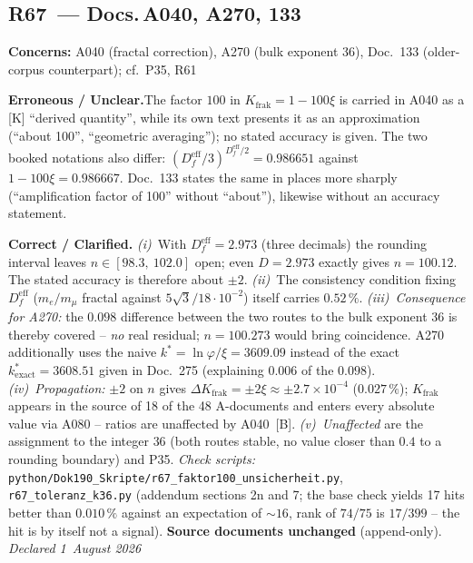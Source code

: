 \medskip

\subsection*{R67~--- Docs.\,A040, A270, 133}

\noindent\textbf{Concerns:} A040 (fractal correction), A270 (bulk exponent 36),
Doc.~133 (older-corpus counterpart); cf.\ P35, R61

\smallskip\noindent\textbf{Erroneous / Unclear.}\quad The factor $100$ in
$K_\text{frak} = 1-100\xi$ is carried in A040 as a [K] \enquote{derived
quantity}, while its own text presents it as an approximation
(\enquote{about 100}, \enquote{geometric averaging}); no stated accuracy is
given. The two booked notations also differ:
$(D_f^\text{eff}/3)^{D_f^\text{eff}/2} = 0.986651$ against
$1-100\xi = 0.986667$. Doc.~133 states the same in places more sharply
(\enquote{amplification factor of 100} without \enquote{about}), likewise
without an accuracy statement.

\smallskip\noindent\textbf{Correct / Clarified.}\quad
\emph{(i)}~With $D_f^\text{eff} = 2.973$ (three decimals) the rounding
interval leaves $n \in [98.3,\ 102.0]$ open; even $D = 2.973$ exactly gives
$n = 100.12$. The stated accuracy is therefore about $\pm2$.
\emph{(ii)}~The consistency condition fixing $D_f^\text{eff}$ ($m_e/m_\mu$
fractal against $5\sqrt3/18\cdot10^{-2}$) itself carries $0.52\,\%$.
\emph{(iii)~Consequence for A270:} the $0.098$ difference between the two
routes to the bulk exponent $36$ is thereby covered -- \emph{no} real
residual; $n = 100.273$ would bring coincidence. A270 additionally uses the
naive $k^{*} = \ln\varphi/\xi = 3609.09$ instead of the exact
$k^{*}_\text{exact} = 3608.51$ given in Doc.~275 (explaining $0.006$ of the
$0.098$). \emph{(iv)~Propagation:} $\pm2$ on $n$ gives
$\Delta K_\text{frak} = \pm2\xi \approx \pm2.7\times10^{-4}$ ($0.027\,\%$);
$K_\text{frak}$ appears in the source of 18 of the 48 A-documents and enters
every absolute value via A080 -- ratios are unaffected by A040~[B].
\emph{(v)~Unaffected} are the assignment to the integer $36$ (both routes
stable, no value closer than $0.4$ to a rounding boundary) and P35.
\emph{Check scripts:}
\texttt{python/Dok190\_Skripte/r67\_faktor100\_unsicherheit.py},
\texttt{r67\_toleranz\_k36.py} (addendum sections 2n and 7; the base check
yields 17 hits better than $0.010\,\%$ against an expectation of $\sim16$,
rank of $74/75$ is $17/399$ -- the hit is by itself not a signal).
\textbf{Source documents unchanged} (append-only).
\emph{Declared 1~August 2026}

